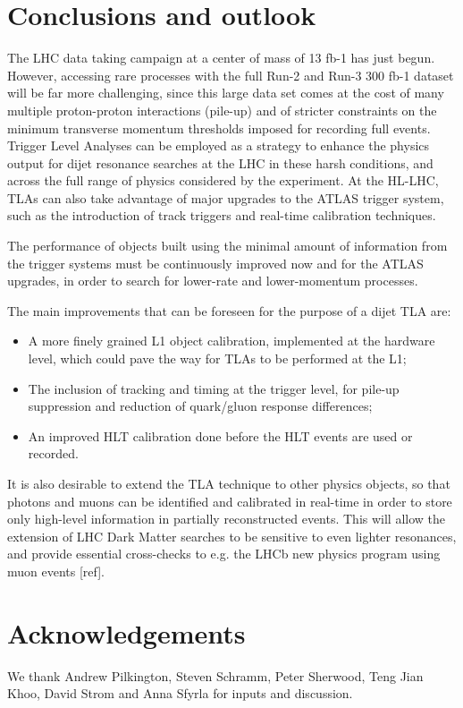 \documentclass[a4paper,justified]{tufte-handout}
\begin{document}
\section{Conclusions and outlook}

The LHC data taking campaign at a center of mass of 13 fb-1 has just begun. However, accessing rare processes with the full Run-2 and Run-3 300 fb-1 dataset will be far more challenging, since this large data set comes at the cost of many multiple proton-proton interactions (pile-up) and of stricter constraints on the minimum transverse momentum thresholds imposed for recording full events. Trigger Level Analyses can be employed as a strategy to enhance the physics output for dijet resonance searches at the LHC in these harsh conditions, and across the full range of physics considered by the experiment. At the HL-LHC, TLAs can also take advantage of major upgrades to the ATLAS trigger system, such as the introduction of track triggers and real-time calibration techniques. 
 
The performance of objects built using the minimal amount of information from the trigger systems must be continuously improved now and for the ATLAS upgrades, in order to search for lower-rate and lower-momentum processes.
 
The main improvements that can be foreseen for the purpose of a dijet TLA are:

\begin{itemize}
\item A more finely grained L1 object calibration, implemented at the hardware level, which could pave the way for TLAs to be performed at the L1;
\item The inclusion of tracking and timing at the trigger level, for pile-up suppression and reduction of quark/gluon response differences;
\item An improved HLT calibration done before the HLT events are used or recorded.
\end{itemize}

 It is also desirable to extend the TLA technique to other physics objects, so that photons and muons can be identified and calibrated in real-time in order to store only high-level information in partially reconstructed events. This will allow the extension of LHC Dark Matter searches to be sensitive to even lighter resonances, and provide essential cross-checks to e.g. the LHCb new physics program using muon events [ref].
 
 \section{Acknowledgements}
 
 We thank Andrew Pilkington, Steven Schramm, Peter Sherwood, Teng Jian Khoo, David Strom and Anna Sfyrla for inputs and discussion.



\clearpage



\end{document}
